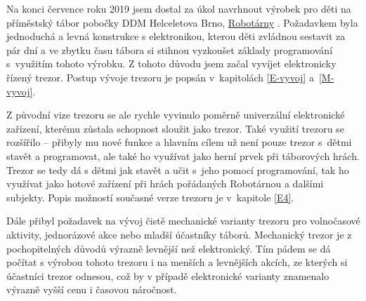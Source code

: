 \small
Na konci července roku 2019 jsem dostal za úkol navrhnout výrobek pro děti na příměstský tábor pobočky DDM Helceletova Brno, \href{https://helceletka.cz/robotarna/}{Robotárny} \parencite{robotarna}.
Poža\-dav\-kem byla jednoduchá a levná konstrukce s elektronikou, kterou děti zvládnou sestavit za pár dní a ve zbytku času tábora si stihnou vyzkoušet základy programování 
s~využitím tohoto výrobku. Z tohoto důvodu jsem začal vyvíjet elektronicky řízený trezor. Postup vývoje trezoru je popsán v~kapitolách \ref{E-vyvoj} a~\ref{M-vyvoj}.

Z původní vize trezoru se ale rychle vyvinulo poměrně univerzální elektronické zařízení, kterému zůstala schopnost sloužit jako trezor.
Také využití trezoru se rozšířilo -- přibyly mu nové funkce a hlavním cílem už není pouze trezor  s~dětmi stavět a programovat, 
ale také ho využívat jako herní prvek při táborových hrách. 
Trezor se tedy dá s dětmi jak stavět a učit s~jeho pomocí programování, tak ho využívat jako hotové zařízení při hrách pořádaných Robotárnou a dalšími subjekty.
Popis možností současné verze trezoru je v~kapitole \ref{E4}.

Dále přibyl požadavek na vývoj čistě mechanické varianty trezoru pro volnočasové aktivity, jednorázové akce nebo mladší účastníky táborů.
Mechanický trezor je z pochopitelných důvodů výrazně levnější než elektronický. Tím pádem se dá počítat s výrobou tohoto trezoru i na menších a levnějších akcích, ze kterých 
si účastníci trezor odnesou, což by v případě elektronické varianty znamenalo výrazně vyšší cenu i časovou náročnost.
\normalsize



